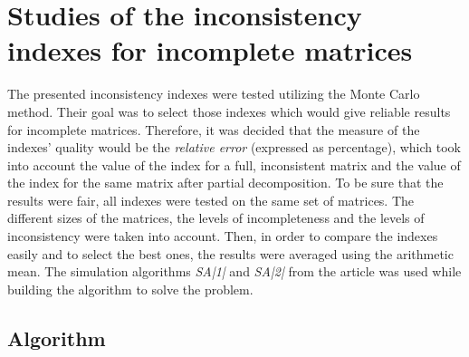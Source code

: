 \chapter{Studies of the inconsistency indexes for incomplete matrices}
\label{sec:studiesOfInconsistencyIndexesForIncompleteMatrices}

The presented inconsistency indexes were tested utilizing the Monte Carlo method. Their goal was to select those indexes which would give reliable results for incomplete matrices. Therefore, it was decided that the measure of the indexes' quality would be the \textit{relative error} (expressed as  percentage), which took into account the value of the index for a full, inconsistent matrix and the value of the index for the same matrix after partial decomposition. To be sure that the results were fair, all indexes were tested on the same set of matrices. The different sizes of the matrices, the levels of incompleteness and the levels of inconsistency were taken into account. Then, in order to compare the indexes easily and to select the best ones, the results were averaged using the arithmetic mean. The simulation algorithms \textit{SA|1|} and \textit{SA|2|} from the article \cite{Kazibudzki2017} was used while building the algorithm to solve the problem.


\section{Algorithm}
